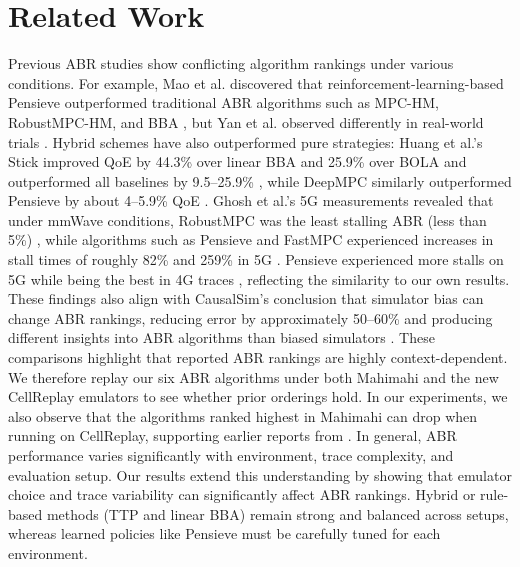\section{Related Work}\label{s:related}

Previous ABR studies show conflicting algorithm rankings under various conditions. For example, Mao et al. discovered that reinforcement-learning-based Pensieve outperformed traditional ABR algorithms such as MPC-HM, RobustMPC-HM, and BBA \cite{pensieve-sigcomm}, but Yan et al. observed differently in real-world trials \cite{yan2020-situ}. Hybrid schemes have also outperformed pure strategies: Huang et al.’s Stick improved QoE by 44.3\% over linear BBA and 25.9\% over BOLA \cite{stick-infocom20} and outperformed all baselines by 9.5–25.9\% \cite{stick-infocom20}, while DeepMPC similarly outperformed Pensieve by about 4–5.9\% QoE \cite{deepmpc-icip20}. Ghosh et al.’s 5G measurements revealed that under mmWave conditions, RobustMPC was the least stalling ABR (less than 5\%) \cite{5g-variegated}, while algorithms such as Pensieve and FastMPC experienced increases in stall times of roughly 82\% and 259\% in 5G \cite{5g-variegated}. Pensieve experienced more stalls on 5G while being the best in 4G traces \cite{5g-variegated}, reflecting the similarity to our own results. These findings also align with CausalSim’s conclusion that simulator bias can change ABR rankings, reducing error by approximately 50–60\% and producing different insights into ABR algorithms than biased simulators \cite{causalsim-nsdi23}. These comparisons highlight that reported ABR rankings are highly context-dependent. We therefore replay our six ABR algorithms under both Mahimahi and the new CellReplay emulators to see whether prior orderings hold. In our experiments, we also observe that the algorithms ranked highest in Mahimahi can drop when running on CellReplay, supporting earlier reports from \cite{5g-variegated}. In general, ABR performance varies significantly with environment, trace complexity, and evaluation setup. Our results extend this understanding by showing that emulator choice and trace variability can significantly affect ABR rankings. 
Hybrid or rule-based methods (TTP and linear BBA) remain strong and balanced across setups, whereas learned policies like Pensieve must be carefully tuned for each environment.

